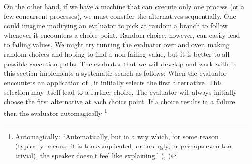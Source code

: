 On the other hand, if we have a machine that can execute only one process (or a few concurrent processes), we must consider the alternatives sequentially.
One could imagine modifying an evaluator to pick at random a branch to follow whenever it encounters a choice point.
Random choice, however, can easily lead to failing values.
We might try running the evaluator over and over, making random choices and hoping to find a non-failing value, but it is better to  all possible execution paths.
The  evaluator that we will develop and work with in this section implements a systematic search as follows:
When the evaluator encounters an application of , it initially selects the first alternative.
This selection may itself lead to a further choice.
The evaluator will always initially choose the first alternative at each choice point.
If a choice results in a failure, then the evaluator automagically%
\footnote{
	Automagically:
	“Automatically, but in a way which, for some reason (typically because it is too complicated, or too ugly, or perhaps even too trivial), the speaker doesn’t feel like explaining.”
	(, )\label{Footnote 4.47}
}

